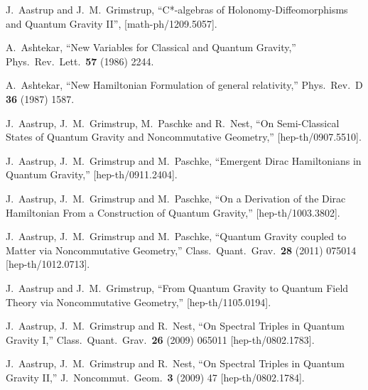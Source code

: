 \documentclass[12pt]{article}
\begin{document}
\begin{thebibliography}{99}




  J.~Aastrup and J.~M.~Grimstrup,
  ``C*-algebras of Holonomy-Diffeomorphisms and Quantum Gravity II'',
 [math-ph/1209.5057].




  A.~Ashtekar,
  ``New Variables for Classical and Quantum Gravity,''
  Phys.\ Rev.\ Lett.\  {\bf 57} (1986) 2244.

  A.~Ashtekar,
  ``New Hamiltonian Formulation of general relativity,''
  Phys.\ Rev.\  D {\bf 36} (1987) 1587.




  J.~Aastrup, J.~M.~Grimstrup, M.~Paschke and R.~Nest,
  ``On Semi-Classical States of Quantum Gravity and Noncommutative Geometry,''
  [hep-th/0907.5510].

  J.~Aastrup, J.~M.~Grimstrup and M.~Paschke,
  ``Emergent Dirac Hamiltonians in Quantum Gravity,''  
  [hep-th/0911.2404].


  J.~Aastrup, J.~M.~Grimstrup and M.~Paschke,
  ``On a Derivation of the Dirac Hamiltonian From a Construction of Quantum
  Gravity,''
 [hep-th/1003.3802].




  J.~Aastrup, J.~M.~Grimstrup and M.~Paschke,
  ``Quantum Gravity coupled to Matter via Noncommutative Geometry,''
  Class.\ Quant.\ Grav.\  {\bf 28} (2011) 075014
  [hep-th/1012.0713].

  J.~Aastrup and J.~M.~Grimstrup,
  ``From Quantum Gravity to Quantum Field Theory via Noncommutative Geometry,''
  [hep-th/1105.0194].


  J.~Aastrup, J.~M.~Grimstrup and R.~Nest,
  ``On Spectral Triples in Quantum Gravity I,''
  Class.\ Quant.\ Grav.\  {\bf 26} (2009) 065011
  [hep-th/0802.1783].



  J.~Aastrup, J.~M.~Grimstrup and R.~Nest,
  ``On Spectral Triples in Quantum Gravity II,''
  J.\ Noncommut.\ Geom.\  {\bf 3} (2009) 47
  [hep-th/0802.1784].







\end{thebibliography}
\end{document}
